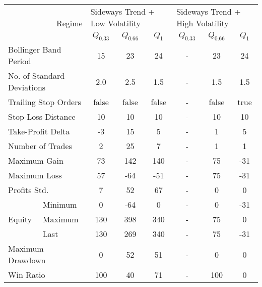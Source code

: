 \begin{tabular}{ll|cccccc}
    \toprule
    \multicolumn{2}{r|}{\multirow{2}{*}{Regime}} & \multicolumn{3}{l}{Sideways Trend + Low Volatility} & \multicolumn{3}{l}{Sideways Trend + High Volatility}  \\
    \multicolumn{2}{r|}{} & $Q_{0.33}$ & $Q_{0.66}$ & $Q_{1}$ & $Q_{0.33}$ & $Q_{0.66}$ & $Q_{1}$ \\
    \midrule
    \multicolumn{2}{l|}{Bollinger Band Period} & 15 & 23 & 24 & - & 23 & 24 \\
    \multicolumn{2}{l|}{No. of Standard Deviations} & 2.0 & 2.5 & 1.5 & - & 1.5 & 1.5 \\
    \multicolumn{2}{l|}{Trailing Stop Orders} & false & false & false & - & false & true \\
    \multicolumn{2}{l|}{Stop-Loss Distance} & 10 & 10 & 10 & - & 10 & 10 \\
    \multicolumn{2}{l|}{Take-Profit Delta} & -3 & 15 & 5 & - & 1 & 5 \\
    \midrule
    \multicolumn{2}{l|}{Number of Trades} & 2 & 25 & 7 & - & 1 & 1 \\
    \multicolumn{2}{l|}{Maximum Gain} & 73 & 142 & 140 & - & 75 & -31 \\
    \multicolumn{2}{l|}{Maximum Loss} & 57 & -64 & -51 & - & 75 & -31 \\
    \multicolumn{2}{l|}{Profits Std.} & 7 & 52 & 67 & - & 0 & 0 \\
    \multirow{3}{*}{Equity} & Minimum & 0   & -64 & 0   & - & 0  & -31 \\
    & Maximum & 130 & 398 & 340 & - & 75 & 0   \\
    & Last    & 130 & 269 & 340 & - & 75 & -31 \\
    \multicolumn{2}{l|}{Maximum Drawdown} & 0 & 52 & 51 & - & 0 & 0 \\
    \multicolumn{2}{l|}{Win Ratio} & 100 & 40 & 71 & - & 100 & 0 \\
    \bottomrule
\end{tabular}